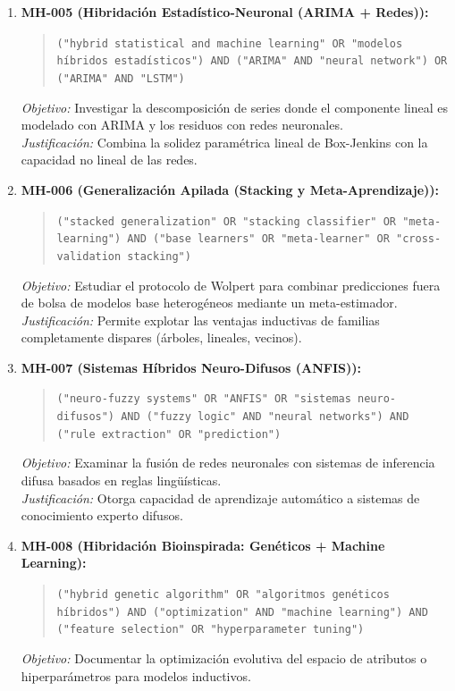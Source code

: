 \begin{enumerate}
  \textit{Justificación:} Fundamento teórico y metodológico de la arquitectura práctica desarrollada en este proyecto.
  \item \textbf{MH-005 (Hibridación Estadístico-Neuronal (ARIMA + Redes)):}
  \begin{quote}
  \texttt{("hybrid statistical and machine learning" OR "modelos híbridos estadísticos") AND ("ARIMA" AND "neural network") OR ("ARIMA" AND "LSTM")}
  \end{quote}
  \textit{Objetivo:} Investigar la descomposición de series donde el componente lineal es modelado con ARIMA y los residuos con redes neuronales.\\
  \textit{Justificación:} Combina la solidez paramétrica lineal de Box-Jenkins con la capacidad no lineal de las redes.
  \item \textbf{MH-006 (Generalización Apilada (Stacking y Meta-Aprendizaje)):}
  \begin{quote}
  \texttt{("stacked generalization" OR "stacking classifier" OR "meta-learning") AND ("base learners" OR "meta-learner" OR "cross-validation stacking")}
  \end{quote}
  \textit{Objetivo:} Estudiar el protocolo de Wolpert para combinar predicciones fuera de bolsa de modelos base heterogéneos mediante un meta-estimador.\\
  \textit{Justificación:} Permite explotar las ventajas inductivas de familias completamente dispares (árboles, lineales, vecinos).
  \item \textbf{MH-007 (Sistemas Híbridos Neuro-Difusos (ANFIS)):}
  \begin{quote}
  \texttt{("neuro-fuzzy systems" OR "ANFIS" OR "sistemas neuro-difusos") AND ("fuzzy logic" AND "neural networks") AND ("rule extraction" OR "prediction")}
  \end{quote}
  \textit{Objetivo:} Examinar la fusión de redes neuronales con sistemas de inferencia difusa basados en reglas lingüísticas.\\
  \textit{Justificación:} Otorga capacidad de aprendizaje automático a sistemas de conocimiento experto difusos.
  \item \textbf{MH-008 (Hibridación Bioinspirada: Genéticos + Machine Learning):}
  \begin{quote}
  \texttt{("hybrid genetic algorithm" OR "algoritmos genéticos híbridos") AND ("optimization" AND "machine learning") AND ("feature selection" OR "hyperparameter tuning")}
  \end{quote}
  \textit{Objetivo:} Documentar la optimización evolutiva del espacio de atributos o hiperparámetros para modelos inductivos.\\

\end{enumerate}
